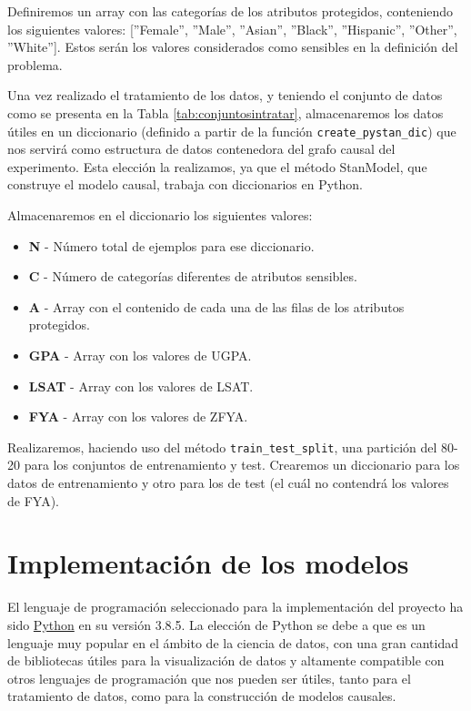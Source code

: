 \documentclass[oneside,openright,titlepage,numbers=noenddot,openany,headinclude,footinclude=true,
cleardoublepage=empty,abstractoff,BCOR=5mm,paper=a4,fontsize=12pt,main=spanish]{scrreprt}
\begin{document}
\clearpage

Definiremos un array con las categorías de los atributos protegidos, conteniendo los siguientes valores: [''Female'', ''Male'', ''Asian'', ''Black'', ''Hispanic'', ''Other'', ''White'']. Estos serán los valores considerados como sensibles en la definición del problema.

Una vez realizado el tratamiento de los datos, y teniendo el conjunto de datos como se presenta en la Tabla \ref{tab:conjuntosintratar}, almacenaremos los datos útiles en un diccionario (definido a partir de la función \texttt{create\_pystan\_dic}) que nos servirá como estructura de datos contenedora del grafo causal del experimento. Esta elección la realizamos, ya que el método StanModel, que construye el modelo causal, trabaja con diccionarios en Python.

Almacenaremos en el diccionario los siguientes valores:

\begin{itemize}
    \item \textbf{N} - Número total de ejemplos para ese diccionario.
    \item \textbf{C} - Número de categorías diferentes de atributos sensibles.
    \item \textbf{A} - Array con el contenido de cada una de las filas de los atributos protegidos.
    \item \textbf{GPA} - Array con los valores de UGPA.
    \item \textbf{LSAT} - Array con los valores de LSAT.
    \item \textbf{FYA} - Array con los valores de ZFYA.
\end{itemize}

Realizaremos, haciendo uso del método \texttt{train\_test\_split}, una partición del 80-20 para los conjuntos de entrenamiento y test. Crearemos un diccionario para los datos de entrenamiento y otro para los de test (el cuál no contendrá los valores de FYA).

\section{Implementación de los modelos}

El lenguaje de programación seleccionado para la implementación del proyecto ha sido \href{https://docs.python.org/es/3.8/}{Python} en su versión 3.8.5. La elección de Python se debe a que es un lenguaje muy popular en el ámbito de la ciencia de datos, con una gran cantidad de bibliotecas útiles para la visualización de datos y altamente compatible con otros lenguajes de programación que nos pueden ser útiles, tanto para el tratamiento de datos, como para la construcción de modelos causales.
\end{document}
